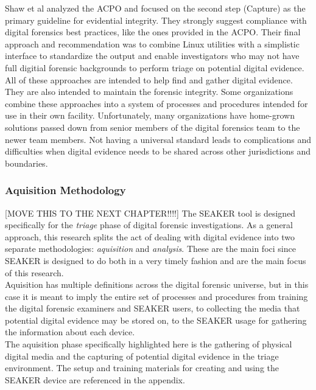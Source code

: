 \documentclass[12pt]{article}
\begin{document}
Shaw et al\cite{shaw2013practical} analyzed the ACPO and focused on the second step (Capture)
as the primary guideline for evidential integrity.  They strongly suggest compliance with
digital forensics best practices, like the ones provided in the ACPO.  Their final approach
and recommendation was to combine Linux utilities with a simplistic interface to standardize
the output and enable investigators who may not have full digitial forensic backgrounds
to perform triage on potential digital evidence.\\

All of these approaches are intended to help find and gather digital evidence.  They are also intended
to maintain the forensic integrity.  Some organizations combine these approaches into a system of
processes and procedures intended for use in their own facility.  Unfortunately, many organizations have
home-grown solutions passed down from senior members of the digital forensics team to the newer
team members.  Not having a universal standard 
leads to complications and difficulties when digital evidence needs to be shared across other
jurisdictions and boundaries\cite{ajijola2014review}.\\

\subsubsection{Aquisition Methodology}

[MOVE THIS TO THE NEXT CHAPTER!!!!]
The SEAKER tool is designed specifically for the {\em triage} phase of digital forensic
investigations.  As a general approach, this research splits the act of dealing with digital evidence into two
separate methodologies: {\em aquisition} and {\em analysis}.  These are the main foci since SEAKER is 
designed to do both in a very timely fashion and are the main focus of this research.\\

Aquisition has multiple definitions across
the digital forensic universe, but in this case it is meant to imply the entire set of processes and
procedures from training the digital forensic examiners and SEAKER users,
to collecting the media that potential digital evidence may be stored on, 
to the SEAKER usage for gathering the information about each device.\\

The aquisition phase specifically highlighted here is the gathering of physical digital
media and the capturing of potential digital evidence in the triage environment.  The 
setup and training materials for creating and using the SEAKER device are referenced in
the appendix.\\
\end{document}
